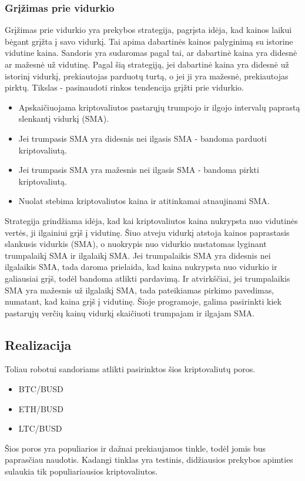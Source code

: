 \documentclass{VUMIFInfKursinis}
\begin{document}
\subsubsection{Grįžimas prie vidurkio}

Grįžimas prie vidurkio yra prekybos strategija, pagrįsta idėja, kad kainos laikui bėgant grįžta į savo vidurkį. 
Tai apima dabartinės kainos palyginimą su istorine vidutine kaina. Sandoris yra sudaromas pagal tai, ar dabartinė kaina yra didesnė ar mažesnė už vidutinę.
Pagal šią strategiją, jei dabartinė kaina yra didesnė už istorinį vidurkį, prekiautojas parduotų turtą, o jei ji yra mažesnė, prekiautojas pirktų. 
Tikslas - pasinaudoti rinkos tendencija grįžti prie vidurkio.

\begin {itemize}
\item Apskaičiuojama kriptovaliutos pastarųjų trumpojo ir ilgojo intervalų paprastą slenkantį vidurkį (SMA).
\item Jei trumpasis SMA yra didesnis nei ilgasis SMA - bandoma parduoti kriptovaliutą.
\item Jei trumpasis SMA yra mažesnis nei ilgasis SMA - bandoma pirkti kriptovaliutą.
\item Nuolat stebima kriptovaliutos kaina ir atitinkamai atnaujinami SMA.
\end {itemize}

Strategija grindžiama idėja, kad kai kriptovaliutos kaina nukrypsta nuo vidutinės vertės, ji ilgainiui grįš į vidutinę. Šiuo atveju vidurkį atstoja kainos paprastasis slankusis vidurkis (SMA),
o nuokrypis nuo vidurkio nustatomas lyginant trumpalaikį SMA ir ilgalaikį SMA. Jei trumpalaikis SMA yra didesnis nei ilgalaikis SMA, tada daroma prielaida, kad kaina nukrypsta nuo vidurkio
ir galiausiai grįš, todėl bandoma atlikti pardavimą. Ir atvirkščiai, jei trumpalaikis SMA yra mažesnis už ilgalaikį SMA, tada pateikiamas pirkimo pavedimas, numatant, kad kaina grįš į vidutinę.
Šioje programoje, galima pasirinkti kiek pastarųjų verčių kainų vidurkį skaičiuoti trumpajam ir ilgajam SMA.


\subsection{Realizacija}

Toliau robotui sandoriams atlikti pasirinktos šios kriptovaliutų poros. 
\begin {itemize}
\item BTC/BUSD
\item ETH/BUSD
\item LTC/BUSD
\end {itemize}
Šios poros yra populiarios ir dažnai prekiaujamos tinkle, todėl jomis bus paprasčiau naudotis. Kadangi tinklas yra testinis, didžiausios prekybos apimties sulaukia
tik populiariausios kriptovaliutos.
\end{document}
